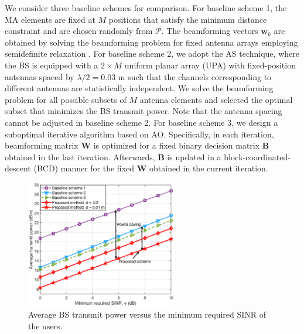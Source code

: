\documentclass[12pt, draftclsnofoot, onecolumn]{IEEEtran}
\begin{document}
We consider three baseline schemes for comparison. For baseline scheme 1, the MA elements are fixed at $M$ positions that satisfy the minimum distance constraint and are chosen randomly from $\mathcal{P}$. The beamforming vectors $\mathbf{w}_k$ are obtained by solving the beamforming problem for fixed antenna arrays employing semidefinite relaxation \cite{xu2020resource}. For baseline scheme 2, we adopt the AS technique, where the BS is equipped with a $2\times M$ uniform planar array (UPA) with fixed-position antennas spaced by $\lambda/2=0.03$ m such that the channels corresponding to different antennas are statistically independent. We solve the beamforming problem for all possible subsets of $M$ antenna elements and selected the optimal subset that minimizes the BS transmit power. Note that the antenna spacing cannot be adjusted in baseline scheme 2. For baseline scheme 3, we design a suboptimal iterative algorithm based on AO. Specifically, in each iteration, beamforming matrix $\mathbf{W}$ is optimized for a fixed binary decision matrix $\mathbf{B}$ obtained in the last iteration. Afterwards, $\mathbf{B}$ is updated in a block-coordinated-descent (BCD) manner for the fixed $\mathbf{W}$ obtained in the current iteration. 

\begin{figure}
    \centering
    \includegraphics[width=2.6in]{figures/Tran_power_vs_SINR_MA_4_4_MIMO_FR_model.eps}
    \caption{Average BS transmit power versus the minimum required SINR of the users.}
    \label{fig:SINR}
\end{figure}
\end{document}
